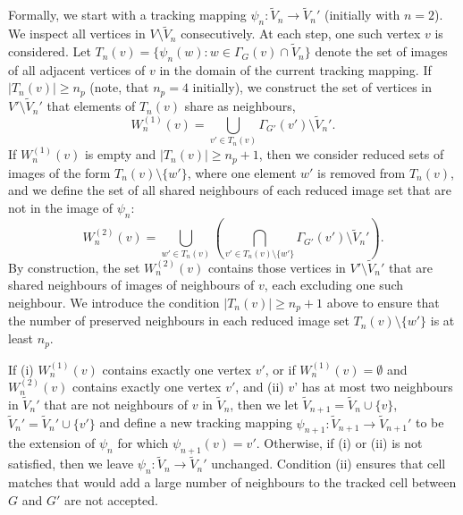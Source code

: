 \documentclass[a4paper,11pt]{article}
\begin{document}
Formally, we start with a tracking mapping $\psi_{n} : \tilde{V}_n \rightarrow \tilde{V}_{n}'$ (initially with $n=2$). 
We inspect all vertices in $V \setminus \tilde{V}_{n}$ consecutively. 
At each step, one such vertex $v$ is considered.
Let $T_{n}(v) = \{ \psi_{n} (w) : w \in \Gamma_{G}(v) \cap \tilde{V}_{n} \}$ denote the set of images of all adjacent vertices of $v$ in the domain of the current tracking mapping. 
If $| T_{n}(v) | \geq n_p$ (note, that $n_p = 4$ initially), we construct the set of vertices in $V' \setminus \tilde{V}_{n}'$ that elements of $T_{n}(v)$ share as neighbours, 
%
\begin{equation}
W_{n}^{(1)}(v) = \bigcup_{v' \in T_{n}(v)} \Gamma_{G'}(v') \setminus \tilde{V}_{n}'.
\end{equation}
%
If $W_{n}^{(1)}(v)$ is empty and $| T_{n}(v) | \geq n_p+1$, then we consider reduced sets of images of the form $T_{n}(v) \setminus \{ w' \}$, where one element $w'$ is removed from $T_{n}(v)$, and we define the set of all shared neighbours of each reduced image set that are not in the image of $\psi_{n}$:
%
\begin{equation}
W_{n}^{(2)}(v) = \bigcup_{w' \in T_{n}(v)} \left( \bigcap_{v' \in T_{n}(v) \setminus \{ w' \}} \Gamma_{G'}(v') \setminus \tilde{V}_{n}' \right).
\end{equation}
%
By construction, the set $W_{n}^{(2)}(v)$ contains those vertices in $V' \setminus \tilde{V}_{n}'$ that are shared neighbours of images of neighbours of $v$, each excluding one such neighbour. 
We introduce the condition $| T_{n}(v) | \geq n_p+1$ above to ensure that the number of preserved neighbours in each reduced image set $T_{n}(v) \setminus \{ w' \}$ is at least $n_p$.
 
If (i) $W_{n}^{(1)}(v)$ contains exactly one vertex $v'$, or if $W_{n}^{(1)}(v) = \emptyset$ and $W_{n}^{(2)}(v)$ contains exactly one vertex $v'$, and (ii) $v$' has at most two neighbours in $\tilde{V}_{n}'$ that are not neighbours of $v$ in $\tilde{V}_{n}$, then we let $\tilde{V}_{n+1} = \tilde{V}_{n} \cup \{v\}$, $\tilde{V}_{n}' = \tilde{V}_{n}' \cup \{v'\}$ and define a new tracking mapping $\psi_{n+1}: \tilde{V}_{n+1} \rightarrow \tilde{V}_{n+1}'$ to be the extension of $\psi_{n}$ for which $\psi_{n+1}(v) = v'$. 
Otherwise, if (i) or (ii) is not satisfied, then we leave $\psi_{n} : \tilde{V}_{n} \rightarrow \tilde{V}_{n}'$ unchanged. 
Condition (ii) ensures that cell matches that would add a large number of neighbours to the tracked cell between $G$ and $G'$ are not accepted. 
\end{document}
